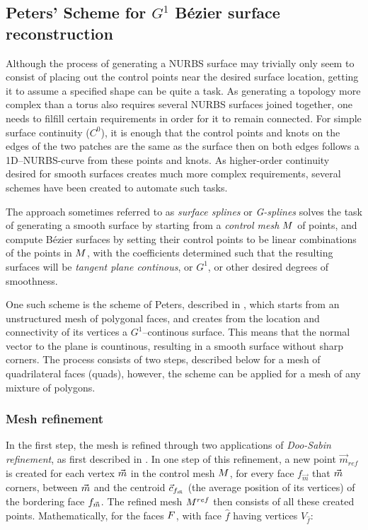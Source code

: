 \subsection{Peters' Scheme for $G^1$ B{\'e}zier surface reconstruction}
\label{subsec:peters}
Although the process of generating a NURBS surface may trivially only seem to consist of placing out the control points near the desired surface location, getting it to assume a specified shape can be quite a task. As generating a topology more complex than a torus  also requires several NURBS surfaces joined together, one needs to filfill certain requirements in order for it to remain connected. For simple surface continuity ($C^0$), it is enough that the control points and knots on the edges of the two patches are the same as the surface then on both edges follows a 1D--NURBS-curve from these points and knots. As higher-order continuity desired for smooth surfaces creates much more complex requirements, several schemes have been created to automate such tasks.

The approach sometimes referred to as \emph{surface splines} or \emph{G-splines} \cite{eck1996automatic} solves the task of generating a smooth surface by starting from a \emph{control mesh} $\petersControlMesh$ of points, and compute B{\'e}zier surfaces by setting their control points to be linear combinations of the points in $\petersControlMesh$, with the coefficients determined such that the resulting surfaces will be \emph{tangent plane continous}, or $G^1$, or other desired degrees of smoothness. 

One such scheme is the scheme of Peters, described in \cite{peters1992constructing}, which starts from an unstructured mesh of polygonal faces, and creates from the location and connectivity of its vertices a $G^1$--continous surface. This means that the normal vector to the plane is countinous, resulting in a smooth surface without sharp corners. The process consists of two steps, described below for a mesh of quadrilateral faces (quads), however, the scheme can be applied for a mesh of any mixture of polygons.

\subsubsection{Mesh refinement}
In the first step, the mesh is refined through two applications of \emph{Doo-Sabin refinement}, as first described in \cite{DooSabin1978subdiv}. In one step of this refinement, a new point $\vec{m}_{ref}$  is created for each vertex $\petersControlMeshVec$ in the control mesh $\petersControlMesh$, for every face $f_{\vec{m}}$ that $\petersControlMeshVec$ corners,  between $\petersControlMeshVec$ and the centroid $\centroidof{f_{\petersControlMeshVec}}$ (the average position of its vertices) of the bordering face $f_{\petersControlMeshVec}$. The refined mesh $\petersControlMesh^{ref}$ then consists of all these created points. Mathematically, for the faces $\petersFaces$, with face ${\hat{f}}$ having vertices $V_{\hat{f}}$:

